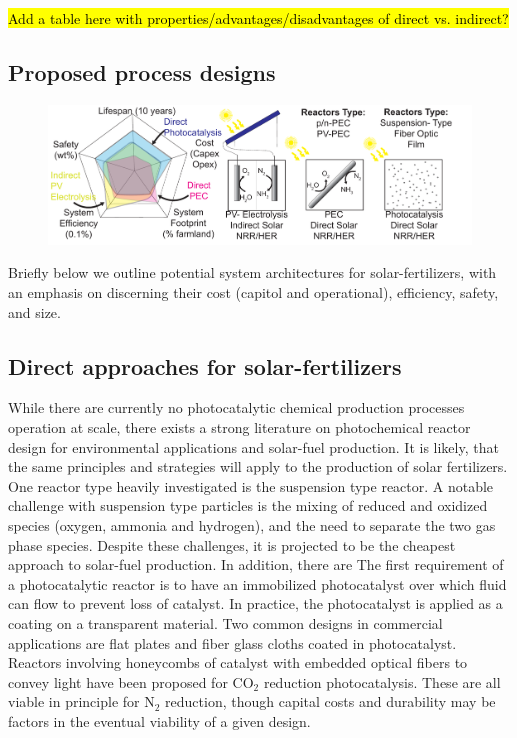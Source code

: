 \hl{Add a table here with properties/advantages/disadvantages of direct vs. indirect?}

\subsection{Proposed process designs}

\begin{figure}
    \centering
    \includegraphics[width=1\textwidth]{Figures/Systems.pdf}
    \caption{}
    \label{fig:systems}
\end{figure}

 Briefly below we outline potential system architectures for solar-fertilizers, with an emphasis on discerning their cost (capitol and operational), efficiency, safety, and size.

\subsection*{Direct approaches for solar-fertilizers}

While there are currently no photocatalytic chemical production processes operation at scale, there exists a strong literature on photochemical reactor design for environmental applications and solar-fuel production.\cite{Mckone_2013,Birnie2006,walter_2010} It is likely, that the same principles and strategies will apply to the production of solar fertilizers. One reactor type heavily investigated is the suspension type reactor. A notable challenge with suspension type particles is the mixing of reduced and oxidized species (oxygen, ammonia and hydrogen), and the need to separate the two gas phase species. Despite these challenges, it is projected to be the cheapest approach to solar-fuel production.  In addition, there are  The first requirement of a photocatalytic reactor is to have an immobilized photocatalyst over which fluid can flow to prevent loss of catalyst. In practice, the photocatalyst is applied as a coating on a transparent material. Two common designs in commercial applications are flat plates\cite{Brandi_1999} and fiber glass cloths\cite{Horikoshi_2002} coated in photocatalyst. Reactors involving honeycombs of catalyst with embedded optical fibers to convey light have been proposed for CO$_2$ reduction photocatalysis.\cite{Ola_2015} These are all viable in principle for N$_2$ reduction, though capital costs and durability may be factors in the eventual viability of a given design.

